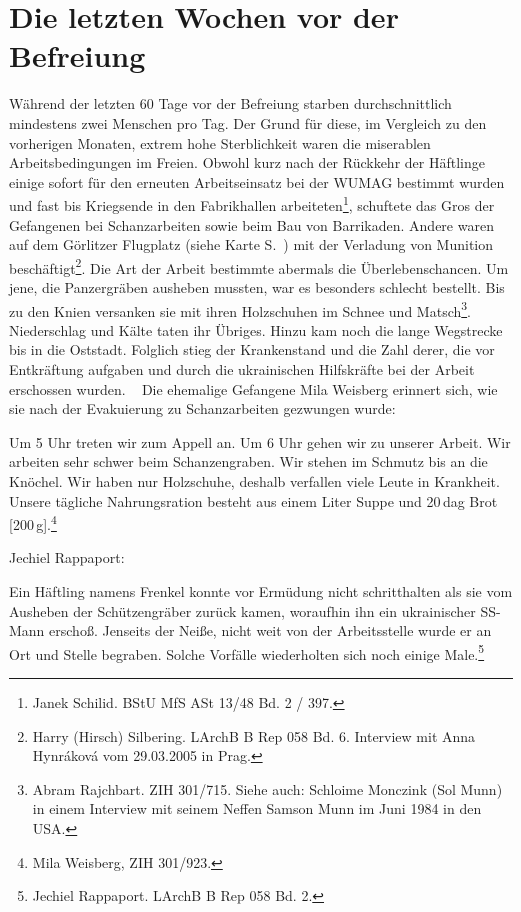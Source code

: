 \documentclass[a4paper,12pt,ngerman,
]{nisebook}
\begin{document}
\newpage

 \section{Die letzten Wochen vor der Befreiung}



Während der letzten 60 Tage vor der Befreiung starben durchschnittlich mindestens zwei Menschen pro Tag. Der Grund für diese, im Vergleich zu den vorherigen Monaten, extrem hohe Sterblichkeit waren die miserablen Arbeitsbedingungen im Freien. Obwohl kurz nach der Rückkehr der Häftlinge einige sofort für den erneuten Arbeitseinsatz bei der WUMAG bestimmt wurden und fast bis Kriegsende in den Fabrikhallen arbeiteten\footnote{Janek Schilid. BStU MfS ASt 13/48 Bd. 2 / 397.}, schuftete das Gros der Gefangenen bei Schanzarbeiten sowie beim Bau von Barrikaden. Andere waren auf dem Görlitzer Flugplatz (siehe Karte S.~\pageref{map_goerlitz}) mit der Verladung von Munition beschäftigt\footnote{Harry (Hirsch) Silbering. LArchB B Rep 058 Bd. 6. Interview mit Anna Hynr\'akov\'a vom 29.03.2005 in Prag.}.
\newline
Die Art der Arbeit bestimmte abermals die Überlebenschancen. Um jene, die Panzergräben ausheben mussten, war es besonders schlecht bestellt. Bis zu den Knien versanken sie mit ihren Holzschuhen im Schnee und Matsch\footnote{Abram Rajchbart. ZIH 301/715. Siehe auch: Schloime Monczink (Sol Munn) in einem Interview mit seinem Neffen Samson Munn im Juni 1984 in den USA.}. Niederschlag und Kälte taten ihr Übriges. Hinzu kam noch die lange Wegstrecke bis in die Oststadt. Folglich stieg der Krankenstand und die Zahl derer, die vor Entkräftung aufgaben und durch die ukrainischen Hilfskräfte bei der Arbeit erschossen wurden. 
~\newline
Die ehemalige Gefangene Mila Weisberg erinnert sich, wie sie nach der Evakuierung zu Schanzarbeiten gezwungen wurde: 
\begin{leftbar} 
Um 5 Uhr treten wir zum Appell an. Um 6 Uhr gehen wir zu unserer Arbeit. Wir arbeiten sehr schwer beim Schanzengraben. Wir stehen im Schmutz bis an die Knöchel. Wir haben nur Holzschuhe, deshalb verfallen viele Leute in Krankheit. Unsere tägliche Nahrungsration besteht aus einem Liter Suppe und 20\,dag Brot [200\,g].\footnote{Mila Weisberg, ZIH 301/923.}
\end{leftbar}
Jechiel Rappaport:
\begin{leftbar} 
Ein Häftling namens Frenkel konnte vor Ermüdung nicht schritthalten als sie vom Ausheben der Schützengräber zurück kamen, woraufhin ihn ein ukrainischer SS-Mann erschoß. Jenseits der Neiße, nicht weit von der Arbeitsstelle wurde er an Ort und Stelle begraben. Solche Vorfälle wiederholten sich noch einige Male.\footnote{Jechiel Rappaport. LArchB B Rep 058 Bd. 2.}
\end{leftbar}
\end{document}
